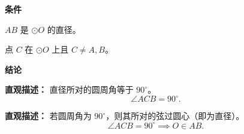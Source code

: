 \begin{statementbox}
	\textbf{\textcolor{CStatement}{条件}}
	\begin{description}[style=nextline, leftmargin=2.8em, labelsep=0.5em, itemsep=0.35em]
		\item[\textbf{\textcolor{CStatement}{条件1（直径条件）：}}] $AB$ 是 $\odot O$ 的直径。
		\item[\textbf{\textcolor{CStatement}{条件2（点与端点）：}}] 点 $C$ 在 $\odot O$ 上且 $C\neq A,B$。
	\end{description}

	\textbf{\textcolor{CStatement}{结论}}
	\begin{description}[style=nextline, leftmargin=2.8em, labelsep=0.5em, itemsep=0.45em]
		\item[\textbf{\textcolor{CStatement}{结论一（圆周角直角）：}}]
			\textbf{\textcolor{CStatement}{直观描述：}}
			直径所对的圆周角等于 $90^\circ$。
			\[
				\angle ACB = 90^\circ.
			\]

		\item[\textbf{\textcolor{CStatement}{推广结论（逆定理）：}}]
			\textbf{\textcolor{CStatement}{直观描述：}}
			若圆周角为 $90^\circ$，则其所对的弦过圆心（即为直径）。
			\[
				\angle ACB = 90^\circ \implies O\in AB.
			\]
	\end{description}
\end{statementbox}
